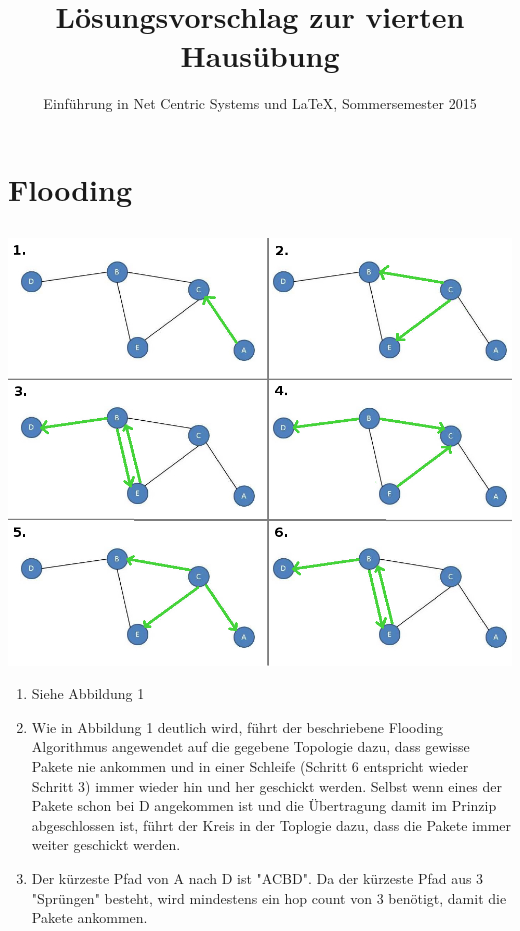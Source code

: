 \documentclass[a4paper,
			llpt,
			solution,
			accentcolor=tud2d,
			colorbacktitle
			]
			{tudexercise}
\title{Lösungsvorschlag zur vierten Hausübung}
\subtitle{Einführung in Net Centric Systems und \LaTeX, Sommersemester 2015}
\newcommand{\8}{$\infty$}
\begin{document}
\maketitle
\section{Flooding}
\subsection{}
\begin{center}
\includegraphics[scale=1.5]{4_1_1.jpg}
\end{center}
\begin{enumerate}
\item Siehe Abbildung 1
\item Wie in Abbildung 1 deutlich wird, führt der beschriebene Flooding Algorithmus angewendet auf die gegebene Topologie dazu, dass gewisse Pakete nie ankommen und in einer Schleife (Schritt 6 entspricht wieder Schritt 3) immer wieder hin und her geschickt werden. Selbst wenn eines der Pakete schon bei D angekommen ist und die Übertragung damit im Prinzip abgeschlossen ist, führt der Kreis in der Toplogie dazu, dass die Pakete immer weiter geschickt werden.
\item Der kürzeste Pfad von A nach D ist "ACBD". Da der kürzeste Pfad aus 3 "Sprüngen" besteht, wird mindestens ein hop count von 3 benötigt, damit die Pakete ankommen.
\end{enumerate}
\end{document}
